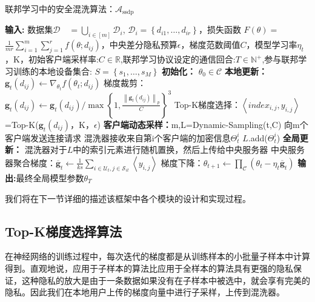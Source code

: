 \begin{algorithm}[!htb]
	\caption{联邦学习中的安全混洗算法：$\mathcal{A}_{\text {ssdp}}$}
	\label{联邦学习中的安全混洗算法}
	\begin{algorithmic}[1]
		\footnotesize
		\STATE \textbf{输入:} 数据集$\mathcal{D} \quad=\bigcup_{i \in[m]} \mathcal{D}_{i}$, $\mathcal{D}_{i}=\left\{d_{i 1}, \ldots, d_{i r}\right\}$，损失函数 $F(\theta)=$ $\frac{1}{m r} \sum_{i=1}^{m} \sum_{j=1}^{r} f\left(\theta ; d_{i j}\right)$，中央差分隐私预算$\epsilon$，梯度范数阈值$C$，模型学习率$\eta_{t}$，K，初始客户端采样率:$C \in \mathbb{R}$,联邦学习协议设定的通信回合:$T \in \mathbb{N}^{+}$,参与联邦学习训练的本地设备集合: $S=\left\{s_{1}, \ldots, s_{M}\right\}$
		\STATE \textbf{初始化：} $\theta_{0} \in \mathcal{C}$
			\STATE \textbf{本地更新：}
					\STATE $\mathbf{g}_{t}\left(d_{i j}\right) \leftarrow \nabla_{\theta_{t}} f\left(\theta_{t} ; d_{i j}\right)$
					\STATE 梯度裁剪：${\mathbf{g}}_{t}\left(d_{i j}\right) \leftarrow \mathbf{g}_{t}\left(d_{i j}\right) / \max \left\{1, \frac{\left\|\mathbf{g}_{t}\left(d_{i j}\right)\right\|_{p}}{C}\right\}^{3}$
					\STATE Top-K梯度选择：$\left\langle index_{i,j}, y_{i,j}\right\rangle$=Top-K(${\mathbf{g}}_{t}\left(d_{i j}\right)$，K，$\epsilon$)
				\ENDFOR
			\ENDFOR
			\STATE \textbf{客户端动态采样：}m,L=Dynamic-Sampling(t,C)
					\STATE 向m个客户端发送连接请求
						\STATE 混洗器接收来自第i个客户端的加密信息$\Theta_{t}^{i}$
						\STATE $L$.add($\Theta_{t}^{i}$)
					\ENDIF
				\ENDWHILE
			\STATE \textbf{全局更新：}
			\STATE 混洗器对于$L$中的索引元素进行随机置换，然后上传给中央服务器
			\STATE 中央服务器聚合梯度：$\overline{\mathbf{g}}_{t} \leftarrow \frac{1}{k s} \sum_{i \in \mathcal{U}_{t}, j \in \mathcal{S}_{i t}} \left\langle y_{i,j} \right\rangle$
			\STATE 梯度下降：$\theta_{t+1} \leftarrow \prod_{\mathcal{C}}\left(\theta_{t}-\eta_{t} \overline{\mathbf{g}}_{t}\right)$
		\ENDFOR
		\STATE \textbf{输出:}最终全局模型参数$\theta_{T}$

	\end{algorithmic}
\end{algorithm}

我们将在下一节详细的描述该框架中各个模块的设计和实现过程。

\subsection{Top-K梯度选择算法}
在神经网络的训练过程中，每次迭代的梯度都是从训练样本的小批量子样本中计算得到。直观地说，应用于子样本的算法比应用于全样本的算法具有更强的隐私保证，这种隐私的放大是由于一条数据如果没有在子样本中被选中，就会享有完美的隐私。因此我们在本地用户上传的梯度向量中进行子采样，上传到混洗器。

